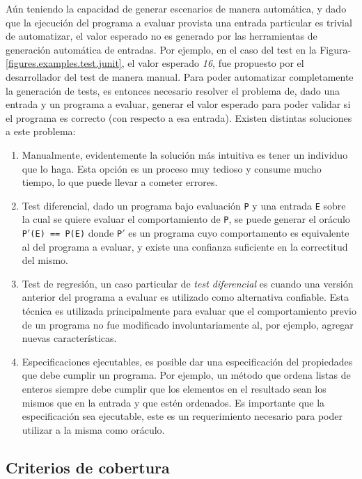 A\'un teniendo la capacidad de generar escenarios de manera autom\'atica, y dado que la ejecuci\'on del programa a evaluar provista una entrada particular es trivial de automatizar, el valor esperado no es generado por las herramientas de generaci\'on autom\'atica de entradas. Por ejemplo, en el caso del test en la Figura-\ref{figures.examples.test.junit}, el valor esperado \emph{16}, fue propuesto por el desarrollador del test de manera manual. Para poder automatizar completamente la generaci\'on de tests, es entonces necesario resolver el problema de, dado una entrada y un programa a evaluar, generar el valor esperado para poder validar si el programa es correcto (con respecto a esa entrada). Existen distintas soluciones a este problema:
\begin{enumerate}
	\item Manualmente, evidentemente la soluci\'on m\'as intuitiva es tener un individuo que lo haga. Esta opci\'on es un proceso muy tedioso y consume mucho tiempo, lo que puede llevar a cometer errores.
	
	\item Test diferencial, dado un programa bajo evaluaci\'on \texttt{P} y una entrada \texttt{E} sobre la cual se quiere evaluar el comportamiento de \texttt{P}, se puede generar el or\'aculo \texttt{P$\prime$(E) == P(E)} donde \texttt{P$\prime$} es un programa cuyo comportamento es equivalente al del programa a evaluar, y existe una confianza suficiente en la correctitud del mismo.
	
	\item Test de regresi\'on, un caso particular de \emph{test diferencial} es cuando una versi\'on anterior del programa a evaluar es utilizado como alternativa confiable. Esta t\'ecnica es utilizada principalmente para evaluar que el comportamiento previo de un programa no fue modificado involuntariamente al, por ejemplo, agregar nuevas caracter\'isticas.
	
	\item Especificaciones ejecutables, es posible dar una especificaci\'on del propiedades que debe cumplir un programa. Por ejemplo, un m\'etodo que ordena listas de enteros siempre debe cumplir que los elementos en el resultado sean los mismos que en la entrada y que est\'en ordenados. Es importante que la especificaci\'on sea ejecutable, este es un requerimiento necesario para poder utilizar a la misma como or\'aculo.
\end{enumerate}

\subsection{Criterios de cobertura}
\label{sec:preliminares.testing.covcriteria}


